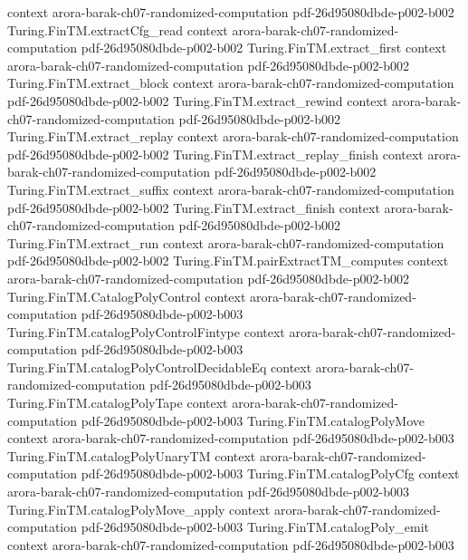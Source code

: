 \begin{theorem}
  {context}
  {arora-barak-ch07-randomized-computation}
  {pdf-26d95080dbde-p002-b002}
\proofstep
  {Turing.FinTM.extractCfg_read}
  {context}
  {arora-barak-ch07-randomized-computation}
  {pdf-26d95080dbde-p002-b002}
\proofstep
  {Turing.FinTM.extract_first}
  {context}
  {arora-barak-ch07-randomized-computation}
  {pdf-26d95080dbde-p002-b002}
\proofstep
  {Turing.FinTM.extract_block}
  {context}
  {arora-barak-ch07-randomized-computation}
  {pdf-26d95080dbde-p002-b002}
\proofstep
  {Turing.FinTM.extract_rewind}
  {context}
  {arora-barak-ch07-randomized-computation}
  {pdf-26d95080dbde-p002-b002}
\proofstep
  {Turing.FinTM.extract_replay}
  {context}
  {arora-barak-ch07-randomized-computation}
  {pdf-26d95080dbde-p002-b002}
\proofstep
  {Turing.FinTM.extract_replay_finish}
  {context}
  {arora-barak-ch07-randomized-computation}
  {pdf-26d95080dbde-p002-b002}
\proofstep
  {Turing.FinTM.extract_suffix}
  {context}
  {arora-barak-ch07-randomized-computation}
  {pdf-26d95080dbde-p002-b002}
\proofstep
  {Turing.FinTM.extract_finish}
  {context}
  {arora-barak-ch07-randomized-computation}
  {pdf-26d95080dbde-p002-b002}
\proofstep
  {Turing.FinTM.extract_run}
  {context}
  {arora-barak-ch07-randomized-computation}
  {pdf-26d95080dbde-p002-b002}
\proofstep
  {Turing.FinTM.pairExtractTM_computes}
  {context}
  {arora-barak-ch07-randomized-computation}
  {pdf-26d95080dbde-p002-b002}
\proofstep
  {Turing.FinTM.CatalogPolyControl}
  {context}
  {arora-barak-ch07-randomized-computation}
  {pdf-26d95080dbde-p002-b003}
\proofstep
  {Turing.FinTM.catalogPolyControlFintype}
  {context}
  {arora-barak-ch07-randomized-computation}
  {pdf-26d95080dbde-p002-b003}
\proofstep
  {Turing.FinTM.catalogPolyControlDecidableEq}
  {context}
  {arora-barak-ch07-randomized-computation}
  {pdf-26d95080dbde-p002-b003}
\proofstep
  {Turing.FinTM.catalogPolyTape}
  {context}
  {arora-barak-ch07-randomized-computation}
  {pdf-26d95080dbde-p002-b003}
\proofstep
  {Turing.FinTM.catalogPolyMove}
  {context}
  {arora-barak-ch07-randomized-computation}
  {pdf-26d95080dbde-p002-b003}
\proofstep
  {Turing.FinTM.catalogPolyUnaryTM}
  {context}
  {arora-barak-ch07-randomized-computation}
  {pdf-26d95080dbde-p002-b003}
\proofstep
  {Turing.FinTM.catalogPolyCfg}
  {context}
  {arora-barak-ch07-randomized-computation}
  {pdf-26d95080dbde-p002-b003}
\proofstep
  {Turing.FinTM.catalogPolyMove_apply}
  {context}
  {arora-barak-ch07-randomized-computation}
  {pdf-26d95080dbde-p002-b003}
\proofstep
  {Turing.FinTM.catalogPoly_emit}
  {context}
  {arora-barak-ch07-randomized-computation}
  {pdf-26d95080dbde-p002-b003}

\end{theorem}
